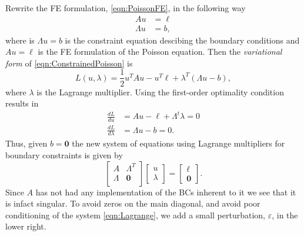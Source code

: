 Rewrite the FE formulation, \eqref{eqn:PoissonFE}, in the following way
\begin{equation}
  \begin{split}
    A u &= \ell \\
    \Lambda u &= b,
  \end{split}
  \label{eqn:ConstrainedPoisson}
\end{equation}
where is $\Lambda u = b$ is the constraint equation descibing the boundary
conditions and $A u = \ell$ is the FE formulation of the Poisson equation.
Then the \emph{variational form} of \eqref{eqn:ConstrainedPoisson} is
\begin{equation}
  L(u,\lambda) = \frac{1}{2}u^T A u - u^T \ell + \lambda^T (\Lambda u - b),
  \label{eqn:Variational}
\end{equation}
where $\lambda$ is the Lagrange multiplier. Using the first-order optimality
condition results in
\begin{equation}
  \begin{split}
    \frac{d L}{du} &= Au - \ell + \Lambda^t \lambda = 0 \\
    \frac{d L}{d\lambda} &= \Lambda u - b = 0.
  \end{split}
  \label{eqn:Condition}
\end{equation}
Thus, given $b = \mathbf{0}$ the new system of equations using Lagrange
multipliers for boundary constraints is given by
\begin{equation}
  \begin{bmatrix}
    A & \Lambda^T \\
    \Lambda &  \mathbf{0} \\
  \end{bmatrix} \begin{bmatrix}
    u \\ \lambda
  \end{bmatrix} = \begin{bmatrix}
    \ell \\ \mathbf{0}
  \end{bmatrix}.
  \label{eqn:Lagrange}
\end{equation}
{\color{red}
Since $A$ has not had any implementation of the BCs inherent to it we see that
it is infact singular.  To avoid zeros on the main diagonal, and avoid poor
conditioning of the system \eqref{eqn:Lagrange}, we add a small perturbation,
$\varepsilon$, in the lower right.}
